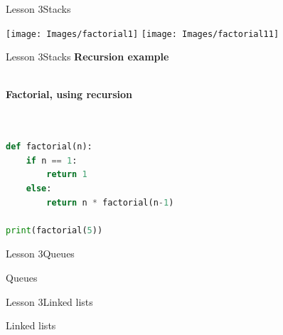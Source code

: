 \documentclass[aspectratio=1610]{beamer}
\begin{document}
\begin{frame}{Lesson 3}{Stacks}
\begin{center}
\texttt{[image: Images/factorial1]}
\texttt{[image: Images/factorial11]}
\end{center}
\end{frame}



\begin{frame}{Lesson 3}{Stacks}
\Large
\textbf{Recursion example}\\~\\
\label{factorial}
\begin{algorithmic}[1]
    \State {}
\Else
    \State {}
\EndIf
\EndProcedure
\end{algorithmic}
\end{frame}


\begin{frame}[fragile]
\Large
\textbf{Factorial, using recursion}\\~\\
\begin{lstlisting}[language=Python]

def factorial(n):
    if n == 1:
        return 1
    else:
        return n * factorial(n-1)

print(factorial(5))
 \end{lstlisting}
\end{frame} 





\begin{frame}{Lesson 3}{Queues}
\begin{center}
\Huge Queues
\end{center}
\end{frame}



\begin{frame}{Lesson 3}{Linked lists}
\begin{center}
\Huge Linked lists
\end{center}
\end{frame}
\end{document}
